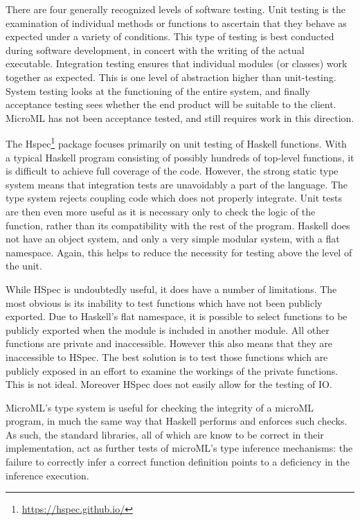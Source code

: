 \documentclass[12pt, a4paper]{report}
\begin{document}
There are four generally recognized levels of software testing. Unit testing is the examination of
individual methods or functions to ascertain that they behave as expected under a variety of
conditions. This type of testing is best conducted during software development, in concert with the
writing of the actual executable. Integration testing ensures that individual modules (or
classes) work together as expected. This is one level of abstraction higher than unit-testing.
System testing looks at the functioning of the entire system, and finally acceptance testing sees
whether the end product will be suitable to the client. MicroML has not been acceptance tested, and
still requires work in this direction.

The Hspec\footnote{\url{https://hspec.github.io/}} package focuses primarily on unit testing of
Haskell functions. With a typical Haskell program consisting of possibly hundreds of top-level
functions, it is difficult to achieve full coverage of the code. However, the strong static type
system means that integration tests are unavoidably a part of the language. The type system rejects
coupling code which does not properly integrate. Unit tests are then even more useful as it is
necessary only to check the logic of the function, rather than its compatibility with the rest of
the program. Haskell does not have an object system, and only a very simple modular system, with a
flat namespace. Again, this helps to reduce the necessity for testing above the level of the unit.

While HSpec is undoubtedly useful, it does have a number of limitations. The most obvious is its
inability to test functions which have not been publicly exported. Due to Haskell's flat namespace,
it is possible to select functions to be publicly exported when the module is included in another
module. All other functions are private and inaccessible. However this also means that they are
inaccessible to HSpec. The best solution is to test those functions which are publicly exposed in an
effort to examine the workings of the private functions. This is not ideal. Moreover HSpec does not
easily allow for the testing of IO.

MicroML's type system is useful for checking the integrity of a microML program, in much the same
way that Haskell performs and enforces such checks. As such, the standard libraries, all of which
are know to be correct in their implementation, act as further tests of microML's type inference
mechanisms: the failure to correctly infer a correct function definition points to a deficiency in
the inference execution.
\end{document}
